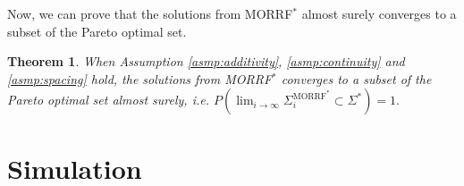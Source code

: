 \documentclass{article}
\newtheorem{thm}{Theorem}
\begin{document}
Now, we can prove that the solutions from MORRF$^{*}$ almost surely converges to a subset of the Pareto optimal set.

\begin{thm}
\label{thm:morrt:conv}
When Assumption \ref{asmp:additivity}, \ref{asmp:continuity} and \ref{asmp:spacing} hold,
the solutions from MORRF$^{*} $ converges to a subset of the Pareto optimal set almost surely, i.e.
$
P( \lim_{ i \rightarrow \infty }  \Sigma^{\mbox{MORRF}^{*}}_{i}  \subset \Sigma^{*} ) = 1.
$
%
\end{thm}

\section{Simulation}
\label{sec:simulation}

\end{document}
